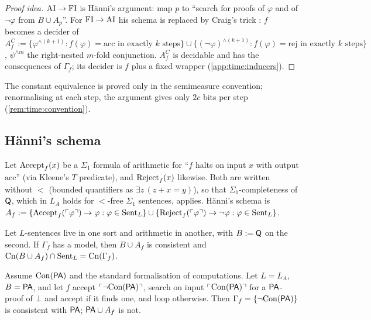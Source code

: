 \begin{proof}[Proof idea]
$\mathrm{AI}\to\mathrm{FI}$ is H\"anni's argument: map $p$ to ``search for proofs of $\varphi$ and of $\neg\varphi$ from $B\cup A_p$''. For $\mathrm{FI}\to\mathrm{AI}$ his schema is replaced by Craig's trick \citep{craig1953axiomatizability}: $f$ becomes a decider of
$A^C_f:=\{\varphi^{\wedge(k+1)}:f(\varphi)=\mathrm{acc}\text{ in exactly }k\text{ steps}\}\cup\{(\neg\varphi)^{\wedge(k+1)}:f(\varphi)=\mathrm{rej}\text{ in exactly }k\text{ steps}\}$, $\psi^{\wedge m}$ the right-nested $m$-fold conjunction. $A^C_f$ is decidable and has the consequences of $\Gamma_f$; its decider is $f$ plus a fixed wrapper (\cref{app:time:inducers}).
\end{proof}

The constant equivalence is proved only in the semimeasure convention; renormalising at each step, the argument gives only $2c$ bits per step (\cref{rem:time:convention}).

\subsection{H\"anni's schema}\label{sec:time:schema}

Let $\mathrm{Accept}_{f}(x)$ be a $\Sigma_1$ formula of arithmetic for ``$f$ halts on input $x$ with output $\mathrm{acc}$'' (via Kleene's $T$ predicate), and $\mathrm{Reject}_{f}(x)$ likewise. Both are written without $<$ (bounded quantifiers as $\exists z\,(z+x=y)$), so that $\Sigma_1$-completeness of $\mathsf{Q}$, which in $L_A$ holds for $<$-free $\Sigma_1$ sentences, applies. H\"anni's schema is
$A_f:=\{\mathrm{Accept}_{f}(\ulcorner \varphi\urcorner)\to\varphi:\varphi\in\mathrm{Sent}_L\}\cup\{\mathrm{Reject}_{f}(\ulcorner \varphi\urcorner)\to\neg\varphi:\varphi\in\mathrm{Sent}_L\}$.

\begin{proposition}\label{prop:time:twosorted}
Let $L$-sentences live in one sort and arithmetic in another, with $B:=\mathsf{Q}$ on the second. If $\Gamma_f$ has a model, then $B\cup A_f$ is consistent and $\mathrm{Cn}(B\cup A_f)\cap\mathrm{Sent}_L=\mathrm{Cn}(\Gamma_f)$.
\end{proposition}

\begin{proposition}\label{prop:time:single}
Assume $\mathrm{Con}(\mathsf{PA})$ and the standard formalisation of computations. Let $L=L_A$, $B=\mathsf{PA}$, and let $f$ accept $\ulcorner \neg\mathrm{Con}(\mathsf{PA})\urcorner$, search on input $\ulcorner \mathrm{Con}(\mathsf{PA})\urcorner$ for a $\mathsf{PA}$-proof of $\bot$ and accept if it finds one, and loop otherwise. Then $\Gamma_f=\{\neg\mathrm{Con}(\mathsf{PA})\}$ is consistent with $\mathsf{PA}$; $\mathsf{PA}\cup A_f$ is not.
\end{proposition}

